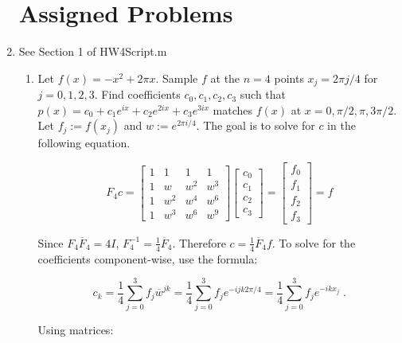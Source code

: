 \documentclass[a4paper]{article}
\begin{document}
\begin{enumerate}
\newpage
\section*{Assigned Problems}
\item

See Section 1 of HW4Script.m

\begin{enumerate}
	\item
	Let $f(x) = -x^2 + 2\pi x$. Sample $f$ at the $n=4$ points
	$x_j = 2\pi j / 4$ for $j = 0,1,2,3$. Find coefficients
	$c_0, c_1, c_2, c_3$ such that 
	$p(x) = c_0 +c_1e^{ix} + c_2e^{2ix} +c_3e^{3ix}$ matches $f(x)$ at 
	$x = 0, \pi /2 , \pi , 3\pi/2$.\\
	
	Let $f_j := f(x_j)$ and $w := e^{2\pi i / 4}$. The goal is to solve
	for $c$ in the following equation. 
	
	 $$
	 F_4c =
	 \begin{bmatrix}
	 1 & 1 & 1 & 1\\
	 1 & w & w^2 & w^3 \\
	 1 & w^2 & w^4 & w^6 \\
	 1 & w^3 & w^6 & w^9
	 \end{bmatrix}
	 \begin{bmatrix}
	 c_0 \\ c_1 \\ c_2 \\ c_3
	 \end{bmatrix}
	 = 
	 \begin{bmatrix}
	 f_0 \\ f_1 \\ f_2 \\ f_3
	 \end{bmatrix} = f
	 $$
	 
	 Since $F_4\overline{F}_4 = 4I$, 
	 $F_4^{-1} = \frac{1}{4}\overline{F}_4$. Therefore
	 $c = \frac{1}{4}\overline{F}_4 f$. To solve for the coefficients
	 component-wise, use the formula:
	 
	 $$
	 c_k = \frac{1}{4}\sum_{j=0}^3 f_j\overline{w}^{jk}
	 = \frac{1}{4} \sum_{j=0}^3 f_j e^{- i j k 2\pi / 4}
	 = \frac{1}{4} \sum_{j=0}^3 f_j e^{-ikx_j}  \;.
	 $$
	 
	 Using matrices:
	 

\end{enumerate}
\end{enumerate}
\end{document}
